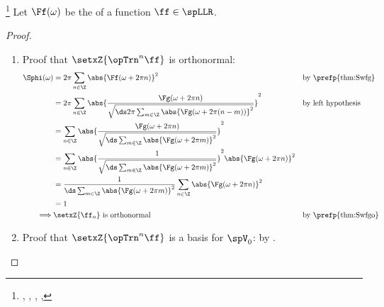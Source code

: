 \begin{theorem}
\footnote{
  ,
  ,
  ,
  ,
  }
\label{thm:blo}
Let $\Ff(\omega)$ be the   of a function $\ff\in\spLLR$.
\end{theorem}
\begin{proof}
\begin{enumerate}
\item Proof that $\setxZ{\opTrn^n\ff}$ is orthonormal:
\begin{align*}
  \Sphi(\omega)
    &= 2\pi\sum_{n\in\Z} \abs{\Ff(\omega+2\pi n)}^2
    && \text{by \prefp{thm:Swfg}}
  \\&= 2\pi\sum_{n\in\Z} \abs{\frac{\Fg(\omega+2\pi n)}{\sqrt{\ds2\pi\sum_{m\in\Z}\abs{\Fg(\omega+2\pi(n-m))}^2}}}^2
    && \text{by left hypothesis}
  \\&= \sum_{n\in\Z} \abs{\frac{\Fg(\omega+2\pi n)}{\sqrt{\ds\sum_{m\in\Z}\abs{\Fg(\omega+2\pi m)}^2}}}^2
  \\&= \sum_{n\in\Z} \abs{ \frac{1}{\sqrt{\ds\sum_{m\in\Z}\abs{\Fg(\omega+2\pi m)}^2}} }^2
               \abs{\Fg(\omega+2\pi n)}^2
  \\&= \frac{1}{\ds\sum_{m\in\Z}\abs{\Fg(\omega+2\pi m)}^2}
        \sum_{n\in\Z} \abs{\Fg(\omega+2\pi n)}^2
  \\&= 1
  \\ \implies & \text{$\setxZ{\ff_n}$ is orthonormal}
    && \text{by \prefp{thm:Swfgo}}
\end{align*}


\item Proof that $\setxZ{\opTrn^n\ff}$ is a basis for $\spV_0$: by .

\end{enumerate}
\end{proof}

